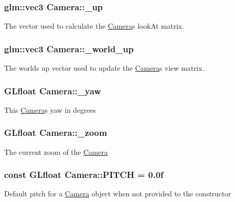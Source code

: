 \subsubsection[{\texorpdfstring{\+\_\+up}{_up}}]{\setlength{\rightskip}{0pt plus 5cm}glm\+::vec3 Camera\+::\+\_\+up}\hypertarget{classCamera_a323a698e4c5773ee3ec380851b145e2d}{}\label{classCamera_a323a698e4c5773ee3ec380851b145e2d}
The vector used to calculate the \hyperlink{classCamera}{Camera}\textquotesingle{}s look\+At matrix. 
\subsubsection[{\texorpdfstring{\+\_\+world\+\_\+up}{_world_up}}]{\setlength{\rightskip}{0pt plus 5cm}glm\+::vec3 Camera\+::\+\_\+world\+\_\+up}\hypertarget{classCamera_aa5d721a01ba1cb41eafb02e39ea29e03}{}\label{classCamera_aa5d721a01ba1cb41eafb02e39ea29e03}
The world\textquotesingle{}s up vector used to update the \hyperlink{classCamera}{Camera}\textquotesingle{}s view matrix. 
\subsubsection[{\texorpdfstring{\+\_\+yaw}{_yaw}}]{\setlength{\rightskip}{0pt plus 5cm}G\+Lfloat Camera\+::\+\_\+yaw}\hypertarget{classCamera_ab815461cc043db1f5810c2f488641740}{}\label{classCamera_ab815461cc043db1f5810c2f488641740}
This \hyperlink{classCamera}{Camera}\textquotesingle{}s yaw in degrees 
\subsubsection[{\texorpdfstring{\+\_\+zoom}{_zoom}}]{\setlength{\rightskip}{0pt plus 5cm}G\+Lfloat Camera\+::\+\_\+zoom}\hypertarget{classCamera_a99dc4d95f58be2427ff6c8d93c676ecd}{}\label{classCamera_a99dc4d95f58be2427ff6c8d93c676ecd}
The current zoom of the \hyperlink{classCamera}{Camera} 
\subsubsection[{\texorpdfstring{P\+I\+T\+CH}{PITCH}}]{\setlength{\rightskip}{0pt plus 5cm}const G\+Lfloat Camera\+::\+P\+I\+T\+CH = 0.\+0f\hspace{0.3cm}{\ttfamily [static]}}\hypertarget{classCamera_afd43f32a47d2db8922dc32030fd84379}{}\label{classCamera_afd43f32a47d2db8922dc32030fd84379}
Default pitch for a \hyperlink{classCamera}{Camera} object when not provided to the constructor 
